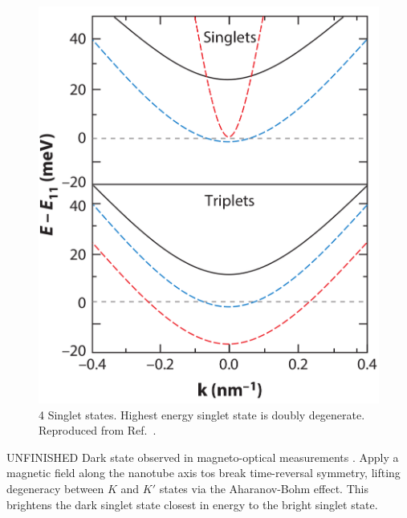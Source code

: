 \begin{figure}[ht]
	\centering
	\includegraphics[scale=0.3]{images/chapter_optical_props/dark_and_bright_excitons}
	\caption{4 Singlet states. Highest energy singlet state is doubly degenerate. Reproduced from Ref.\ \cite{amori2018excitons}.}
\end{figure}

{\color{red} UNFINISHED} Dark state observed in magneto-optical measurements \cite{srivastava2008direct}. Apply a magnetic field along the nanotube axis tos break time-reversal symmetry, lifting degeneracy between $K$ and $K'$ states via the Aharanov-Bohm effect. This brightens the dark singlet state closest in energy to the bright singlet state. 

